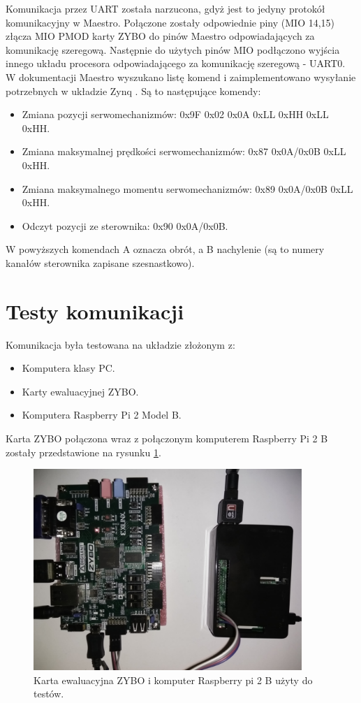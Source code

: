 Komunikacja przez UART została narzucona, gdyż jest to jedyny protokół komunikacyjny w Maestro. 
Połączone zostały odpowiednie piny (MIO 14,15) złącza MIO PMOD karty ZYBO do pinów Maestro odpowiadających za komunikację szeregową.
Następnie do użytych pinów MIO podłączono wyjścia innego układu procesora odpowiadającego za komunikację szeregową - UART0.
W dokumentacji Maestro wyszukano listę komend i zaimplementowano wysyłanie potrzebnych w układzie Zynq \cite{MM}. Są to następujące komendy:
\begin{itemize}
\item Zmiana pozycji serwomechanizmów: 0x9F 0x02 0x0A 0xLL 0xHH 0xLL 0xHH.
\item Zmiana maksymalnej prędkości serwomechanizmów: 0x87 0x0A/0x0B 0xLL 0xHH.
\item Zmiana maksymalnego momentu serwomechanizmów: 0x89 0x0A/0x0B 0xLL 0xHH.
\item Odczyt pozycji ze sterownika: 0x90 0x0A/0x0B.
\end{itemize}
W powyższych komendach A oznacza obrót, a B nachylenie (są to numery kanałów sterownika zapisane szesnastkowo).

\section{Testy komunikacji}
\label{testy_komunikacji}
Komunikacja była testowana na układzie złożonym z:
\begin{itemize}
\item Komputera klasy PC.
\item Karty ewaluacyjnej ZYBO.
\item Komputera Raspberry Pi 2 Model B.
\end{itemize}
Karta ZYBO połączona wraz z połączonym komputerem Raspberry Pi 2 B zostały przedstawione na rysunku \ref{fig:raspberry}.

\begin{figure}[h]
	\centering
	\includegraphics[width=4in]{raspberry.jpg}
	\caption{Karta ewaluacyjna ZYBO i komputer Raspberry pi 2 B użyty do testów.}
	\label{fig:raspberry}
\end{figure}

